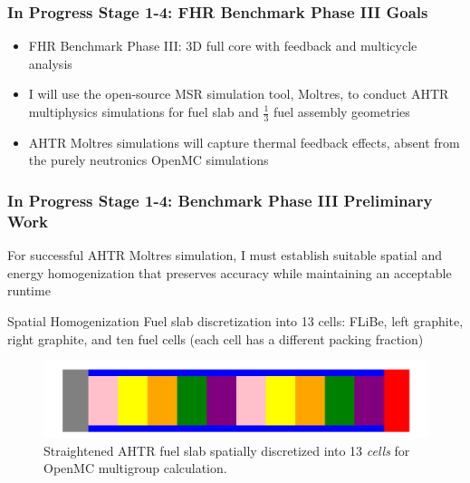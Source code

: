 \begin{frame}
    \frametitle{In Progress Stage 1-4: FHR Benchmark Phase III Goals}
    \begin{itemize}
        \item FHR Benchmark Phase III: 3D full core with feedback and multicycle 
        analysis
        \item I will use the open-source MSR simulation tool, Moltres, to conduct
        AHTR multiphysics simulations for fuel slab and $\frac{1}{3}$
        fuel assembly geometries 
        \item AHTR Moltres simulations will capture thermal feedback effects, 
        absent from the purely neutronics OpenMC simulations
    \end{itemize}
\end{frame}

\begin{frame}
    \frametitle{In Progress Stage 1-4: Benchmark Phase III Preliminary Work}
    For successful AHTR Moltres simulation, I must establish 
    suitable spatial and energy homogenization that preserves accuracy while 
    maintaining an acceptable runtime
\begin{block}{Spatial Homogenization}
    Fuel slab discretization into 13 cells: FLiBe, left graphite, right graphite, 
    and ten fuel cells (each cell has a different packing fraction)
\end{block}
\begin{figure}[]
    \includegraphics[width=0.7\linewidth]{../docs/figures/straightened_slab_mg.png}
    \caption{Straightened AHTR fuel slab spatially discretized into 
    13 \textit{cells} for OpenMC multigroup calculation.}
\end{figure}
\end{frame}

